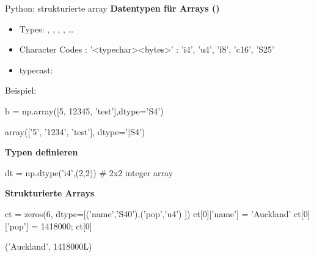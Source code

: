 \documentclass[hyperref={xetex}]{beamer}
\begin{document}
\begin{frame}[fragile]{Python: strukturierte array}
  \textbf{Datentypen für Arrays ()}
  \begin{itemize}
    \item Types:  ,  , , ,  \ldots
    \item Character Codes : '<typechar><bytes>' : 'i4', 'u4', 'f8', 'c16', 'S25'
    \item typecast: 
  \end{itemize}
Beispiel:
  \begin{pyin}
b = np.array([5, 12345, 'test'],dtype='S4')
  \end{pyin}
\begin{pyout}
array(['5', '1234', 'test'], dtype='|S4')
\end{pyout}
\textbf{Typen definieren}
\begin{pyin}
dt = np.dtype('i4',(2,2)) # 2x2 integer array
\end{pyin}
\textbf{Strukturierte Arrays}
\begin{pyin}
ct = zeros(6, dtype=[('name','S40'),('pop','u4') ])
ct[0]['name'] = 'Auckland'
ct[0]['pop'] = 1418000; ct[0]
\end{pyin}
\begin{pyout}
('Auckland', 1418000L)
\end{pyout}
\end{frame}
\end{document}
